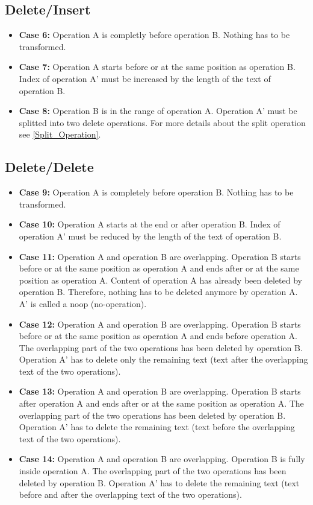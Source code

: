 \subsection{Delete/Insert}
\label{Delete_Insert}
\begin{itemize}
\item \textbf{Case 6:}
Operation A is completly before operation B. Nothing has to be transformed.
\item \textbf{Case 7:}
Operation A starts before or at the same position as operation B. Index of operation A' must be increased by the length of the text of operation B.
\item \textbf{Case 8:}
Operation B is in the range of operation A. Operation A' must be splitted into two delete operations. For more details about the split operation see \ref{Split_Operation}.
\end{itemize}

\subsection{Delete/Delete}
\begin{itemize}
\item \textbf{Case 9:}
Operation A is completely before operation B. Nothing has to be transformed.
\item \textbf{Case 10:}
Operation A starts at the end or after operation B. Index of operation A' must be reduced by the length of the text of operation B.
\item \textbf{Case 11:}
Operation A and operation B are overlapping. Operation B starts before or at the same position as operation A and ends after or at the same position as operation A. Content of operation A has already been deleted by operation B. Therefore, nothing has to be deleted anymore by operation A. A' is called a noop (no-operation).
\item \textbf{Case 12:}
Operation A and operation B are overlapping. Operation B starts before or at the same position as operation A and ends before operation A. The overlapping part of the two operations has been deleted by operation B. Operation A' has to delete only the remaining text (text after the overlapping text of the two operations).
\item \textbf{Case 13:}
Operation A and operation B are overlapping. Operation B starts after operation A and ends after or at the same position as operation A. The overlapping part of the two operations has been deleted by operation B. Operation A' has to delete the remaining text (text before the overlapping text of the two operations).
\item \textbf{Case 14:}
Operation A and operation B are overlapping. Operation B is fully inside operation A. The overlapping part of the two operations has been deleted by operation B. Operation A' has to delete the remaining text (text before and after the overlapping text of the two operations).
\end{itemize}


